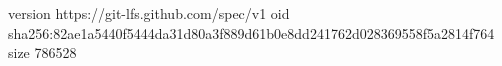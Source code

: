 version https://git-lfs.github.com/spec/v1
oid sha256:82ae1a5440f5444da31d80a3f889d61b0e8dd241762d028369558f5a2814f764
size 786528
